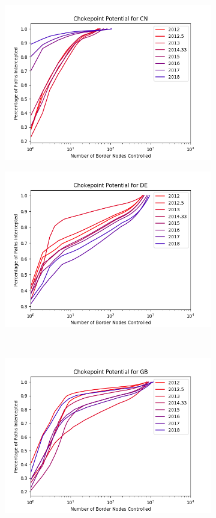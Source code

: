 \documentclass{article}
\begin{document}
\begin{multicols}{2}
\begin{figure}
\begin{subfigure}[b]{0.4\linewidth}
		\includegraphics[width=\linewidth]{single_CN}
	\end{subfigure}
	\begin{subfigure}[b]{0.4\linewidth}
		\includegraphics[width=\linewidth]{single_DE}
	\end{subfigure}
	\\
	\begin{subfigure}[b]{0.4\linewidth}
		\includegraphics[width=\linewidth]{single_GB}

\end{subfigure}
\end{figure}
\end{multicols}
\end{document}
